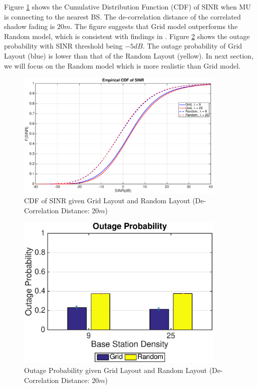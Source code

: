  \par Figure \ref{4:cdf1} shows the Cumulative Distribution Function (CDF) of SINR when MU is connecting to the nearest BS. The de-correlation distance of the correlated shadow fading is $20m$. The figure suggests that Grid model outperforms the Random model, which is consistent with findings in \cite{andrews2011tractable}. Figure \ref{4:outage1} shows the outage probability with SINR threshold being $-5dB$. The outage probability of Grid Layout (blue) is lower than that of the Random Layout (yellow). In next section, we will focus on the Random model which is more realistic than Grid model.
 \begin{figure}
 \centering
 \includegraphics[width=10cm]{GridVSRandom.eps}
 \caption{CDF of SINR given Grid Layout and Random Layout (De-Correlation Distance: $20m$)}
 \label{4:cdf1}
 \end{figure}
 \begin{figure}
 \centering
 \includegraphics[width=10cm]{OutageProbGridVSRandom.eps}
 \caption{Outage Probability given Grid Layout and Random Layout (De-Correlation Distance: $20m$)}
 \label{4:outage1}
 \end{figure}


